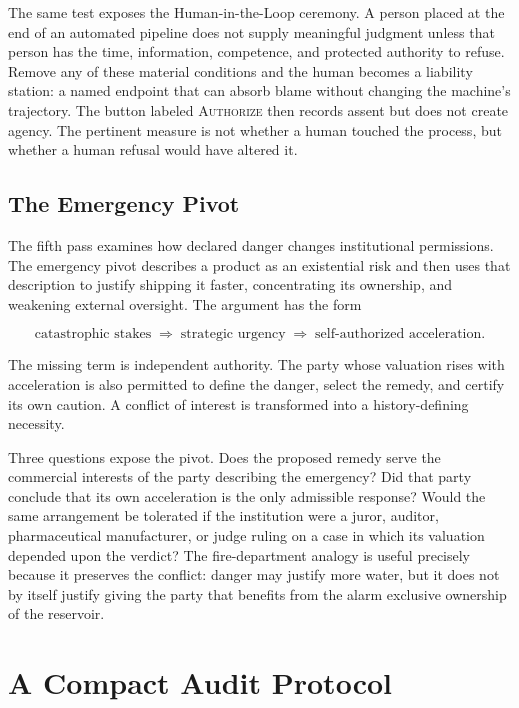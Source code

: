\documentclass[11pt]{article}
\begin{document}
The same test exposes the Human-in-the-Loop ceremony. A person placed at the end of an automated pipeline does not supply meaningful judgment unless that person has the time, information, competence, and protected authority to refuse. Remove any of these material conditions and the human becomes a liability station: a named endpoint that can absorb blame without changing the machine's trajectory. The button labeled \textsc{Authorize} then records assent but does not create agency. The pertinent measure is not whether a human touched the process, but whether a human refusal would have altered it.

\subsection{The Emergency Pivot}

The fifth pass examines how declared danger changes institutional permissions. The emergency pivot describes a product as an existential risk and then uses that description to justify shipping it faster, concentrating its ownership, and weakening external oversight. The argument has the form

\[
  \text{catastrophic stakes}
  \;\Longrightarrow\;
  \text{strategic urgency}
  \;\Longrightarrow\;
  \text{self-authorized acceleration}.
\]

The missing term is independent authority. The party whose valuation rises with acceleration is also permitted to define the danger, select the remedy, and certify its own caution. A conflict of interest is transformed into a history-defining necessity.

Three questions expose the pivot. Does the proposed remedy serve the commercial interests of the party describing the emergency? Did that party conclude that its own acceleration is the only admissible response? Would the same arrangement be tolerated if the institution were a juror, auditor, pharmaceutical manufacturer, or judge ruling on a case in which its valuation depended upon the verdict? The fire-department analogy is useful precisely because it preserves the conflict: danger may justify more water, but it does not by itself justify giving the party that benefits from the alarm exclusive ownership of the reservoir.

\section{A Compact Audit Protocol}
\end{document}
